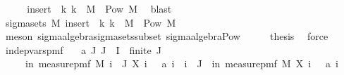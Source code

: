 \begin{isabellebody}
\ \ \isamarkupfalse%
\ \isamarkupfalse%
\ {\isachardoublequoteopen}{\isacharparenleft}{\kern0pt}insert\ {\isacharbraceleft}{\kern0pt}{\isacharbraceright}{\kern0pt}\ {\isacharparenleft}{\kern0pt}{\isacharparenleft}{\kern0pt}{\isasymlambda}k{\isachardot}{\kern0pt}\ {\isacharbraceleft}{\kern0pt}k{\isacharbraceright}{\kern0pt}{\isacharparenright}{\kern0pt}\ {\isacharbackquote}{\kern0pt}\ M{\isacharparenright}{\kern0pt}{\isacharparenright}{\kern0pt}\ {\isasymsubseteq}\ Pow\ M{\isachardoublequoteclose}\ \isamarkupfalse%
\ blast\isanewline
\ \ \isamarkupfalse%
\ {\isachardoublequoteopen}sigma{\isacharunderscore}{\kern0pt}sets\ M\ {\isacharparenleft}{\kern0pt}insert\ {\isacharbraceleft}{\kern0pt}{\isacharbraceright}{\kern0pt}\ {\isacharparenleft}{\kern0pt}{\isacharparenleft}{\kern0pt}{\isasymlambda}k{\isachardot}{\kern0pt}\ {\isacharbraceleft}{\kern0pt}k{\isacharbraceright}{\kern0pt}{\isacharparenright}{\kern0pt}\ {\isacharbackquote}{\kern0pt}\ M{\isacharparenright}{\kern0pt}{\isacharparenright}{\kern0pt}\ {\isasymsubseteq}\ Pow\ M{\isachardoublequoteclose}\isanewline
\ \ \ \ \isamarkupfalse%
\ {\isacharparenleft}{\kern0pt}meson\ sigma{\isacharunderscore}{\kern0pt}algebra{\isachardot}{\kern0pt}sigma{\isacharunderscore}{\kern0pt}sets{\isacharunderscore}{\kern0pt}subset\ sigma{\isacharunderscore}{\kern0pt}algebra{\isacharunderscore}{\kern0pt}Pow{\isacharparenright}{\kern0pt}\isanewline
\ \ \isamarkupfalse%
\ \isamarkupfalse%
\ {\isacharquery}{\kern0pt}thesis\ \isamarkupfalse%
\ force\isanewline
{}\isamarkupfalse%
%
\endisatagproof
{\isafoldproof}%
%
\isadelimproof
\isanewline
%
\endisadelimproof
\isanewline
{}\isamarkupfalse%
\ indep{\isacharunderscore}{\kern0pt}vars{\isacharunderscore}{\kern0pt}pmf{\isacharcolon}{\kern0pt}\isanewline
\ \ \ {\isachardoublequoteopen}{\isasymAnd}a\ J{\isachardot}{\kern0pt}\ J\ {\isasymsubseteq}\ I\ {\isasymLongrightarrow}\ finite\ J\ {\isasymLongrightarrow}\ \isanewline
\ \ \ \ {\isasymP}{\isacharparenleft}{\kern0pt}{\isasymomega}\ in\ measure{\isacharunderscore}{\kern0pt}pmf\ M{\isachardot}{\kern0pt}\ {\isasymforall}i\ {\isasymin}\ J{\isachardot}{\kern0pt}\ X\ i\ {\isasymomega}\ {\isacharequal}{\kern0pt}\ a\ i{\isacharparenright}{\kern0pt}\ {\isacharequal}{\kern0pt}\ {\isacharparenleft}{\kern0pt}{\isasymProd}i\ {\isasymin}\ J{\isachardot}{\kern0pt}\ {\isasymP}{\isacharparenleft}{\kern0pt}{\isasymomega}\ in\ measure{\isacharunderscore}{\kern0pt}pmf\ M{\isachardot}{\kern0pt}\ X\ i\ {\isasymomega}\ {\isacharequal}{\kern0pt}\ a\ i{\isacharparenright}{\kern0pt}{\isacharparenright}{\kern0pt}{\isachardoublequoteclose}\isanewline

\end{isabellebody}
